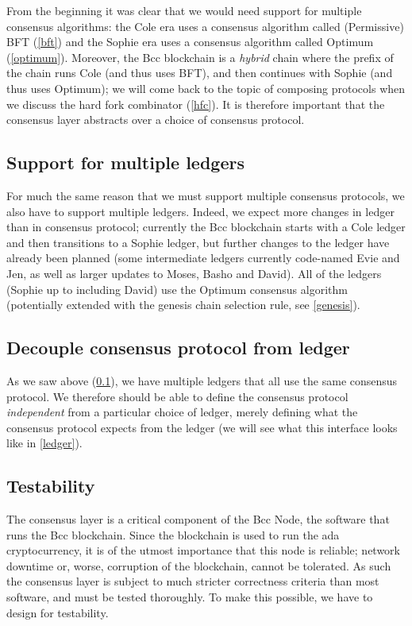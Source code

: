 From the beginning it was clear that we would need support for multiple
consensus algorithms: the Cole era uses a consensus algorithm called
(Permissive) BFT (\cref{bft}) and the Sophie era uses a consensus algorithm
called Optimum (\cref{optimum}). Moreover, the Bcc blockchain is a \emph{hybrid}
chain where the prefix of the chain runs Cole (and thus uses BFT), and then
continues with Sophie (and thus uses Optimum); we will come back to the topic of
composing protocols when we discuss the hard fork combinator (\cref{hfc}). It is
therefore important that the consensus layer abstracts over a choice of
consensus protocol.

\subsection{Support for multiple ledgers}
\label{multiple-ledgers}

For much the same reason that we must support multiple consensus protocols, we
also have to support multiple ledgers. Indeed, we expect more changes in ledger
than in consensus protocol; currently the Bcc blockchain starts with a
Cole ledger and then transitions to a Sophie ledger, but further changes to
the ledger have already been planned (some intermediate ledgers currently
code-named Evie and Jen, as well as larger updates to Moses, Basho and
David). All of the ledgers (Sophie up to including David)
use the Optimum consensus algorithm (potentially extended with the genesis chain
selection rule, see \cref{genesis}).

\subsection{Decouple consensus protocol from ledger}
\label{decouple-consensus-ledger}

As we saw above (\cref{multiple-ledgers}), we have multiple ledgers that all
use the same consensus protocol. We therefore should be able to define the
consensus protocol \emph{independent} from a particular choice of ledger,
merely defining what the consensus protocol expects from the ledger
(we will see what this interface looks like in \cref{ledger}).

\subsection{Testability}
\label{testability}

The consensus layer is a critical component of the Bcc Node, the software
that runs the Bcc blockchain. Since the blockchain is used to run the ada
cryptocurrency, it is of the utmost importance that this node is reliable;
network downtime or, worse, corruption of the blockchain, cannot be tolerated.
As such the consensus layer is subject to much stricter correctness criteria
than most software, and must be tested thoroughly. To make this possible, we
have to design for testability.

